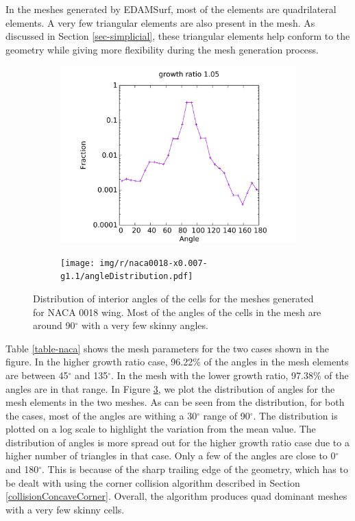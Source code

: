 In the meshes generated by EDAMSurf, most of the elements are quadrilateral elements. A very few triangular elements are also present in the mesh. As discussed in Section \ref{sec-simplicial}, these triangular elements help conform to the geometry while giving more flexibility during the mesh generation process.

\begin{figure}[!hbt]
	\centering
	\begin{subfigure}{0.5\textwidth}
		\centering
		\includegraphics[width=0.9\linewidth]{img/r/naca0018-x0.007-g1.05/angleDistribution.pdf}
		\caption{}
		\label{fig-dist-low}
	\end{subfigure}%
	\begin{subfigure}{0.5\textwidth}
		\centering
		\texttt{[image: img/r/naca0018-x0.007-g1.1/angleDistribution.pdf]}
		\caption{}
		\label{fig-dist-high}
	\end{subfigure}
	\caption[Interior angle distribution of EDAMSurf of NACA0018 wing geometry.]{Distribution of interior angles of the cells for the meshes generated for NACA 0018 wing. Most of the angles of the cells in the mesh are around 90$^\circ$ with a very few skinny angles.}
	\label{fig-angle-distribution}
\end{figure}

Table \ref{table-naca} shows the mesh parameters for the two cases shown in the figure. In the higher growth ratio case, 96.22\% of the angles in the mesh elements are between 45$^\circ$ and 135$^\circ$. In the mesh with the lower growth ratio, 97.38\% of the angles are in that range. In Figure \ref{fig-angle-distribution}, we plot the distribution of angles for the mesh elements in the two meshes. As can be seen from the distribution, for both the cases, most of the angles are withing a 30$^\circ$ range of 90$^\circ$. The distribution is plotted on a log scale to highlight the variation from the mean value. The distribution of angles is more spread out for the higher growth ratio case due to a higher number of triangles in that case. Only a few of the angles are close to 0$^\circ$ and 180$^\circ$. This is because of the sharp trailing edge of the geometry, which has to be dealt with using the corner collision algorithm described in Section \ref{collisionConcaveCorner}. Overall, the algorithm produces quad dominant meshes with a very few skinny cells.

